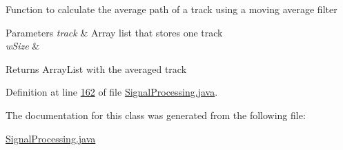 Function to calculate the average path of a track using a moving average filter


\begin{DoxyParams}{Parameters}
{\em track} & Array list that stores one track \\
\hline
{\em w\+Size} & \\
\hline
\end{DoxyParams}
\begin{DoxyReturn}{Returns}
Array\+List with the averaged track 
\end{DoxyReturn}


Definition at line \hyperlink{_signal_processing_8java_source_l00162}{162} of file \hyperlink{_signal_processing_8java_source}{Signal\+Processing.\+java}.



The documentation for this class was generated from the following file\+:\begin{DoxyCompactItemize}
\item 
\hyperlink{_signal_processing_8java}{Signal\+Processing.\+java}\end{DoxyCompactItemize}
